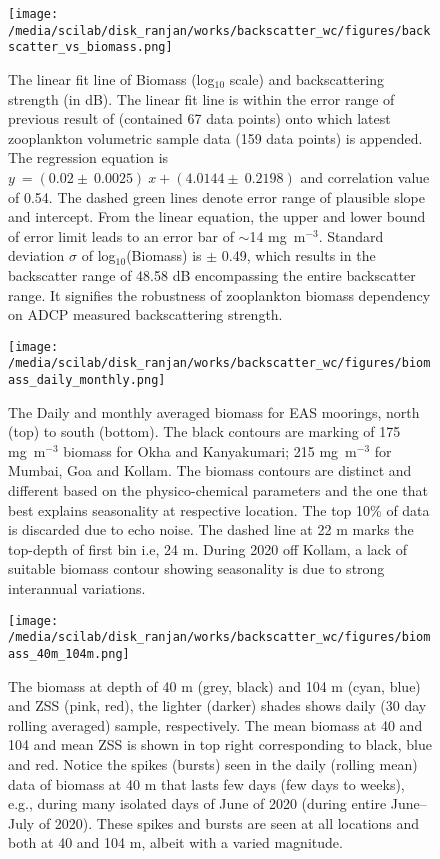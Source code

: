 \documentclass{article}
\begin{document}
\newpage
\begin{figure}[htbp]
	\centering
	\texttt{[image: /media/scilab/disk\_ranjan/works/backscatter\_wc/figures/backscatter\_vs\_biomass.png]} 
	\captionsetup{justification=justified,font=footnotesize,skip=0.05\baselineskip,width=0.8\textwidth}
	\caption{The linear fit line of Biomass (log$_{10}$ scale) and backscattering strength (in dB). The linear fit line is within the error range of previous result of \citep{aparna2022seasonal} (contained 67 data points) onto which latest zooplankton volumetric sample data (159 data points) is appended. The regression equation is $y\ = (0.02 \pm\ 0.0025) \ x + (4.0144 \pm \ 0.2198) $ and correlation value of 0.54. The dashed green lines denote error range of plausible slope and intercept. From the linear equation, the upper and lower bound of error limit leads to an error bar of $\sim$14  mg~m$^{-3}$. Standard deviation $\sigma$ of log$_{10}$(Biomass) is $\pm$ 0.49, which results in the backscatter range of 48.58 dB encompassing the entire backscatter range. It signifies the robustness of zooplankton biomass dependency on ADCP measured backscattering strength.}
	\label{fig:bstobm}
\end{figure}

\newpage

\begin{figure}[htbp]
	\centering
	\texttt{[image: /media/scilab/disk\_ranjan/works/backscatter\_wc/figures/biomass\_daily\_monthly.png]} 
	\captionsetup{justification=justified,font=footnotesize,skip=0.05\baselineskip,width=\textwidth}
	\caption{The Daily and monthly averaged biomass for EAS moorings, north (top) to south (bottom). The black contours are marking of 175 mg~m$^{-3}$ biomass for Okha and Kanyakumari; 215 mg~m$^{-3}$  for Mumbai, Goa and Kollam. The biomass contours are distinct and different based on the physico-chemical parameters and the one that best explains seasonality at respective location.  The top 10\% of data is discarded due to echo noise. The dashed line at 22 m marks the top-depth of first bin i.e, 24 m. During 2020 off Kollam, a lack of suitable biomass contour showing seasonality is due to strong interannual variations.}
	\label{fig:dailynmonthly}
\end{figure}

\begin{figure}[htbp]
	\centering
	\texttt{[image: /media/scilab/disk\_ranjan/works/backscatter\_wc/figures/biomass\_40m\_104m.png]} 
	\captionsetup{justification=justified,font=footnotesize,skip=0.05\baselineskip,width=\textwidth}
	\caption{The biomass at depth of 40 m (grey, black) and 104 m (cyan, blue) and ZSS (pink, red), the lighter (darker) shades shows daily (30 day rolling averaged) sample, respectively. The mean biomass at 40 and 104 and mean ZSS is shown in top right corresponding to black, blue and red. Notice the spikes (bursts) seen in the daily (rolling mean) data of biomass at 40 m that lasts few days (few days to weeks), e.g., during many isolated days of June of 2020 (during entire June--July of 2020). These spikes and bursts are seen at all locations and both at 40 and 104 m, albeit with a varied magnitude.}
	\label{fig:compfourty}
\end{figure}
\end{document}
